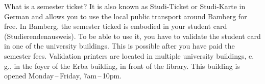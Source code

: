 What is a semester ticket?
It is also known as Studi-Ticket or Studi-Karte in German and allows you to use the local public transport around Bamberg for free.
In Bamberg, the semester ticked is embodied in your student card (Studierenden\-ausweis).
To be able to use it, you have to validate the student card in one of the university buildings.
This is possible after you have paid the semester fees.
Validation printers are located in multiple university buildings, e.\,g., in the foyer of the Erba building, in front of the library.
This building is opened Monday\,--\,Friday, 7am\,--\,10pm. 
